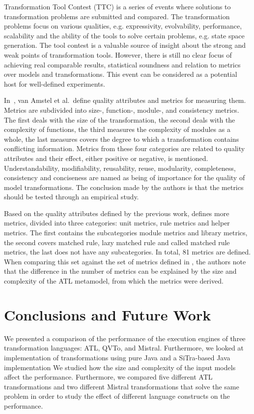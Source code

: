 \documentclass[12pt]{elsarticle}
\begin{document}
Transformation Tool Contest (TTC) \cite{toolcontest} is a series of events where
solutions to transformation problems are submitted and compared. The
transformation problems focus on various qualities, e.g. expressivity,
evolvability, performance, scalability and the ability of the tools to solve
certain problems, e.g. state space generation. The tool contest is a valuable
source of insight about the strong and weak points of transformation tools. However, there is still no clear focus of achieving real comparable results, statistical
soundness and relation to metrics over models and transformations. This event
can be considered as a potential host for well-defined experiments.

In~\cite{Amstel2009}, van Amstel et al.\ define quality attributes and metrics for
measuring them. Metrics are subdivided into size-, function-, module-, and consistency metrics.
The first deals with the size of the transformation, the second deals with the
complexity of functions, the third measures the complexity of modules as a
whole, the last measures covers the degree to which a transformation contains
conflicting information. Metrics from these four categories are related to
quality attributes and their effect, either positive or negative, is mentioned.
Understandability, modifiability, reusability, reuse, modularity, completeness,
consistency and conciseness are named as being of importance for the quality of
model transformations. The conclusion made by the authors is that the metrics
should be tested through an empirical study.

Based on the quality attributes defined by the previous work, \cite{vignaga09}
defines more metrics, divided into three categories: unit metrics, rule metrics
and helper metrics. The first contains the subcategories module metrics and
library metrics, the second covers matched rule, lazy matched rule and called
matched rule metrics, the last does not have any subcategories. In total, 81
metrics are defined. When comparing this set against the set of metrics defined
in \cite{Amstel2009}, the authors note that the difference in the number of
metrics can be explained by the size and complexity of the ATL metamodel, from
which the metrics were derived.

\section{Conclusions and Future Work}\label{sec:conclusion}

We presented a comparison of the performance of the execution engines of three
transformation languages: ATL, QVTo, and Mistral. Furthermore, we looked at
implementation of transformations using pure Java and a SiTra-based Java
implementation We studied how the size and complexity of the input models affect
the performance. Furthermore, we compared five different ATL transformations and
two different Mistral transformations that solve the same problem in order to
study the effect of different language constructs on the performance.
\end{document}

